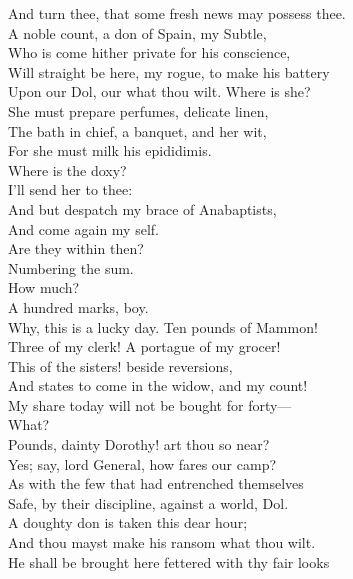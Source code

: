 \documentclass[a4paper,oneside,12pt]{memoir}
\begin{document}
\begin{drama*}
And turn thee, that some fresh news may possess thee.\\
A noble count, a don of Spain, my Subtle,\\
Who is come hither private for his conscience,\\
Will straight be here, my rogue, to make his battery\\
Upon our Dol, our what thou wilt. Where is she?\\
She must prepare perfumes, delicate linen,\\
The bath in chief, a banquet, and her wit,\\
For she must milk his epididimis.\\
Where is the doxy?\\
\subtlespeaks {} I'll send her to thee:\\
And but despatch my brace of Anabaptists,\\
And come again my self.\\
\facespeaks {} Are they within then?\\
\subtlespeaks Numbering the sum.\\
\facespeaks {} How much?\\
\subtlespeaks {} A hundred marks, boy.\\
\facespeaks Why, this is a lucky day. Ten pounds of Mammon!\\
Three of my clerk! A portague of my grocer!\\
This of the sisters! beside reversions,\\
And states to come in the widow, and my count!\\
My share today will not be bought for forty---\\
\dolspeaks What?\\
\facespeaks {} Pounds, dainty Dorothy! art thou so near?\\
\dolspeaks Yes; say, lord General, how fares our camp?\\
\facespeaks As with the few that had entrenched themselves\\
Safe, by their discipline, against a world, Dol.\\
A doughty don is taken this dear hour;\\
And thou mayst make his ransom what thou wilt.\\
He shall be brought here fettered with thy fair looks\\

\end{drama*}
\end{document}
